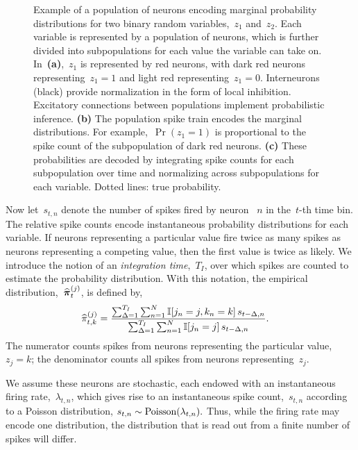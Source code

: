 \begin{figure}[t!]
\begin{subfigure}[b]{1.8in}
    \label{fig:representation_prs}
  \end{subfigure}
  \vspace{-.25in}
  \caption[Example of a population of neurons encoding a probability
    distribution] {Example of a population of neurons encoding marginal
    probability distributions for two binary random variables,~$z_1$
    and~$z_2$. Each variable is represented by a population of neurons,
    which is further divided into subpopulations for each value the variable
    can take on. In~\textbf{(a)},~$z_1$ is represented by red neurons, with
    dark red neurons representing~${z_1=1}$ and light red representing~${z_1=0}$.
    Interneurons (black) provide normalization in the form of local inhibition.
    Excitatory connections between populations implement probabilistic inference.
    \textbf{(b)} The population spike train encodes the marginal distributions.
    For example,~${\Pr(z_1=1)}$ is proportional to the spike count of the subpopulation
    of dark red neurons.
    \textbf{(c)} These probabilities are decoded by integrating
    spike counts for each subpopulation over time and normalizing across
    subpopulations for each variable. Dotted lines: true probability. 
  }
 \label{fig:representation}
\end{figure}



Now let~$s_{t,n}$ denote the number of spikes fired by neuron ~$n$ in
the~$t$-th time bin. The relative spike counts encode instantaneous
probability distributions for each variable.  If neurons representing
a particular value fire twice as many spikes as neurons representing a
competing value, then the first value is twice as likely. We introduce
the notion of an \emph{integration time},~$T_I$, over which spikes are
counted to estimate the probability distribution. With this notation,
the empirical distribution,~$\widehat{\boldsymbol{\pi}}_t^{(j)}$, is defined by,
\begin{align*}
  \widehat{\pi}_{t,k}^{(j)} &=
  \frac{\sum_{\Delta = 1}^{T_I} \sum_{n=1}^N \mathbb{I}[j_n=j, k_n=k] \, s_{t-\Delta,n}}
       {\sum_{\Delta = 1}^{T_I} \sum_{n=1}^N \mathbb{I}[j_n=j] \, s_{t-\Delta,n}}.
\end{align*}
The numerator counts spikes from neurons representing the particular value,~$z_j=k$;
the denominator counts all spikes from neurons representing~$z_j$.


We assume these neurons are stochastic, each endowed
with an instantaneous firing rate,~$\lambda_{t,n}$, which gives rise to an
instantaneous spike count,~$s_{t,n}$ according to a Poisson distribution,
${
s_{t,n} \sim \mathrm{Poisson}(\lambda_{t,n}).
}$
Thus, while the firing rate may encode one distribution, the distribution
that is read out from a finite number of spikes will differ. 

